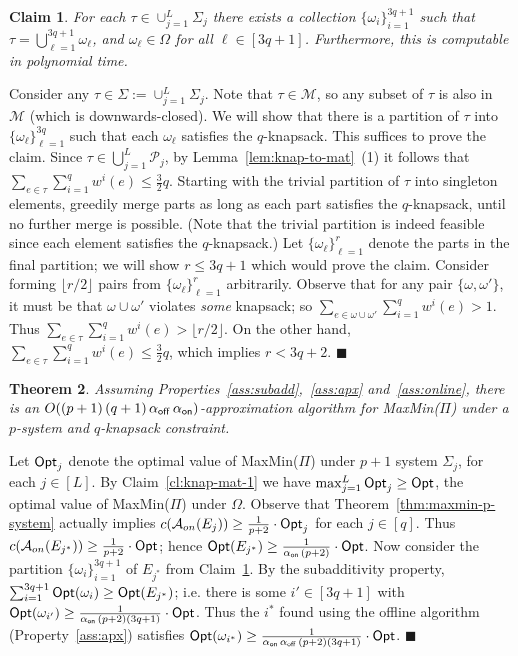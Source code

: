 \documentclass[11pt,letterpaper]{article}
\newtheorem{theorem}{Theorem}[section]
\newtheorem{claim}[theorem]{Claim}
\newenvironment{proof}{

\noindent{\bf Proof:}} {\hfill$\blacksquare$


}
\def\p {\ensuremath{\mathcal{P}}\xspace}
\def\a{\ensuremath{\mathcal{A}}\xspace}
\def\ms{\ensuremath{\mathcal{M}}\xspace}
\def\opt{{\sf Opt}\xspace}
\def\cov{\ensuremath{\Pi}\xspace}
\def\mmp{{\sf MaxMin(\cov)}\xspace}
\newcommand{\offline}{\alpha_{\sf off}}
\newcommand{\online}{\alpha_{\sf on}}
\newcounter{note}[section]
\begin{document}
\begin{claim}\label{cl:knap-mat-2}
For each $\tau\in \cup_{j=1}^L \Sigma_j$ there exists a collection $\{\omega_i\}_{i=1}^{3q+1}$ such that
$\tau=\bigcup_{\ell=1}^{3q+1} \omega_\ell$, and $\omega_\ell\in \Omega$ for all $\ell\in [3q+1]$. Furthermore, this is
computable in polynomial time.
\end{claim}
\begin{proof}
Consider any $\tau\in \Sigma:=\cup_{j=1}^L \Sigma_j$. Note that $\tau\in\ms$, so any subset of $\tau$ is also in $\ms$
(which is downwards-closed). We will show that there is a partition of $\tau$ into $\{\omega_\ell\}_{\ell=1}^{3q}$ such
that each $\omega_\ell$ satisfies the $q$-knapsack. This suffices to  prove the claim. Since $\tau\in \bigcup_{j=1}^L
\p_j$, by Lemma~\ref{lem:knap-to-mat}~(1) it follows that $\sum_{e\in \tau} \sum_{i=1}^q w^i(e) \le \frac32 q$.
Starting with the trivial partition of $\tau$ into singleton elements, greedily merge parts as long as each part
satisfies the $q$-knapsack, until no further merge is possible. (Note that the trivial partition is indeed feasible
since each element satisfies the $q$-knapsack.) Let $\{\omega_\ell\}_{\ell=1}^{r}$  denote the parts in the final
partition; we will show $r\le 3q+1$ which would prove the claim. Consider forming $\lfloor r/2\rfloor$ pairs from
$\{\omega_\ell\}_{\ell=1}^{r}$ arbitrarily. Observe that for any pair $\{\omega, \omega'\}$, it must be that
$\omega\cup \omega'$ violates {\em some} knapsack; so $\sum_{e\in \omega\cup\omega'} \sum_{i=1}^q w^i(e)>1$. Thus
$\sum_{e\in \tau} \sum_{i=1}^q w^i(e)> \lfloor r/2\rfloor$. On the other hand, $\sum_{e\in \tau} \sum_{i=1}^q w^i(e)\le
\frac32 q$, which implies $r< 3q+2$.
\end{proof}

\begin{theorem}\label{thm:max-min-psystem-knapsack}
Assuming Properties~\ref{ass:subadd},~\ref{ass:apx} and~\ref{ass:online}, there is an $O((p+1)\,
(q+1)\,\offline\,\online)$-approximation algorithm for \mmp under a $p$-system and $q$-knapsack constraint.
\end{theorem}
\begin{proof}
Let $\opt_j$ denote the optimal value of \mmp under $p+1$ system $\Sigma_j$, for each $j\in [L]$. By
Claim~\ref{cl:knap-mat-1} we have $\max_{j=1}^L \opt_j\ge \opt$, the optimal value of \mmp under $\Omega$. Observe that
Theorem~\ref{thm:maxmin-p-system} actually implies $c(\a_{on}(E_j))\ge \frac1{p+2}\cdot \opt_j$ for each $j\in[q]$.
Thus $c(\a_{on}(E_{j^*}))\ge \frac1{p+2}\cdot \opt$; hence $\opt(E_{j^*}) \ge \frac1{\online\,(p+2)}\cdot \opt$. Now
consider the partition $\{\omega_i\}_{i=1}^{3q+1}$ of $E_{j^*}$ from Claim~\ref{cl:knap-mat-2}. By the subadditivity
property, $\sum_{i=1}^{3q+1} \opt(\omega_i) \ge \opt(E_{j^*})$; i.e. there is some $i'\in[3q+1]$ with
$\opt(\omega_{i'})\ge \frac1{\online\, (p+2)(3q+1)}\cdot \opt$. Thus the $i^*$ found using the offline algorithm
(Property~\ref{ass:apx}) satisfies $\opt(\omega_{i^*})\ge \frac1{\online\, \offline\,(p+2)(3q+1)}\cdot \opt$.
\end{proof}
\end{document}
